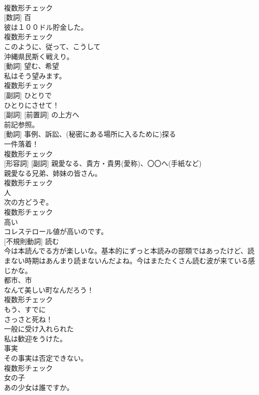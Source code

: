 \documentclass[8pt]{extreport}
\begin{document}
\begin{CJK}{UTF8}{min}
\\	複数形チェック
\\	[名詞] [数詞]	百	
\\	彼は１００ドル貯金した。	
\\	複数形チェック
\\	[副詞]	このように、従って、こうして	
\\	沖縄県民斯く戦えり。	
\\	[名詞] [動詞]	望む、希望	
\\	私はそう望みます。	
\\	複数形チェック
\\	[形容詞] [副詞]	ひとりで	
\\	ひとりにさせて！	
\\	[形容詞] [副詞] [前置詞]	の上方へ	
\\	前記参照。	
\\	[名詞] [動詞]	事例、訴訟、(秘密にある場所に入るために)探る	
\\	一件落着！	
\\	複数形チェック
\\	[名詞] [形容詞] [副詞]	親愛なる、貴方・貴男(愛称)、〇〇へ(手紙など)	
\\	親愛なる兄弟、姉妹の皆さん。	
\\	複数形チェック
\\	[名詞]	人	
\\	次の方どうぞ。	
\\	複数形チェック
\\	[形容詞]	高い	
\\	コレステロール値が高いのです。	
\\	[動詞] [不規則動詞]	読む	
\\	今は本読んでる方が楽しいな。基本的にずっと本読みの部類ではあったけど、読まない時期はあんまり読まないんだよね。今はまたたくさん読む波が来ている感じかな。	
\\	[名詞]	都市、市	
\\	なんて美しい町なんだろう！	
\\	複数形チェック
\\	[副詞]	もう、すでに	
\\	さっさと死ね！	
\\	[形容詞]	一般に受け入れられた	
\\	私は歓迎をうけた。	
\\	[名詞]	事実	
\\	その事実は否定できない。	
\\	複数形チェック
\\	[名詞]	女の子	
\\	あの少女は誰ですか。	

\end{CJK}
\end{document}
